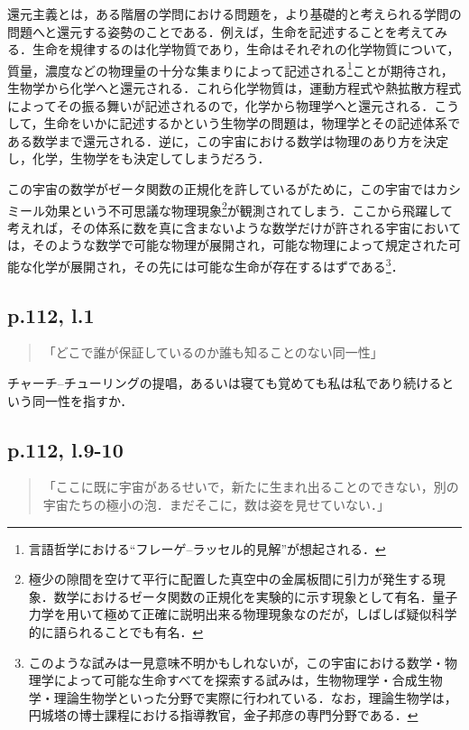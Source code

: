 \documentclass[10pt, a5paper, twoside]{jsarticle}
\theoremstyle{definition}
\begin{document}
			還元主義とは，ある階層の学問における問題を，より基礎的と考えられる学問の問題へと還元する姿勢のことである．例えば，生命を記述することを考えてみる．生命を規律するのは化学物質であり，生命はそれぞれの化学物質について，質量，濃度などの物理量の十分な集まりによって記述される\footnote{言語哲学における“フレーゲ--ラッセル的見解”が想起される．}ことが期待され，生物学から化学へと還元される．これら化学物質は，運動方程式や熱拡散方程式によってその振る舞いが記述されるので，化学から物理学へと還元される．こうして，生命をいかに記述するかという生物学の問題は，物理学とその記述体系である数学まで還元される．逆に，この宇宙における数学は物理のあり方を決定し，化学，生物学をも決定してしまうだろう．

			この宇宙の数学がゼータ関数の正規化を許しているがために，この宇宙ではカシミール効果という不可思議な物理現象\footnote{極少の隙間を空けて平行に配置した真空中の金属板間に引力が発生する現象．数学におけるゼータ関数の正規化を実験的に示す現象として有名．量子力学を用いて極めて正確に説明出来る物理現象なのだが，しばしば疑似科学的に語られることでも有名．}が観測されてしまう．ここから飛躍して考えれば，その体系に数を真に含まないような数学だけが許される宇宙においては，そのような数学で可能な物理が展開され，可能な物理によって規定された可能な化学が展開され，その先には可能な生命が存在するはずである\footnote{このような試みは一見意味不明かもしれないが，この宇宙における数学・物理学によって可能な生命すべてを探索する試みは，生物物理学・合成生物学・理論生物学といった分野で実際に行われている．なお，理論生物学は，円城塔の博士課程における指導教官，金子邦彦の専門分野\cite{knk}である．}．


		\subsection{p.112, l.1}

			\begin{quote}

				「どこで誰が保証しているのか誰も知ることのない同一性」
				
			\end{quote}

			チャーチ--チューリングの提唱，あるいは寝ても覚めても私は私であり続けるという同一性を指すか．

		\subsection{p.112, l.9-10}

			\begin{quote}

				「ここに既に宇宙があるせいで，新たに生まれ出ることのできない，別の宇宙たちの極小の泡．まだそこに，数は姿を見せていない．」
				
			\end{quote}
\end{document}
